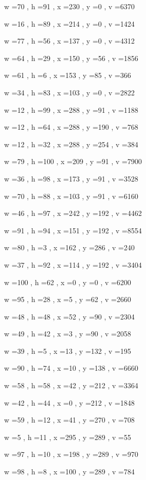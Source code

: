 \documentclass[11pt]{article}
\begin{document}
w =70 , h =91 , x =230 , y =0 , v =6370
\par
w =16 , h =89 , x =214 , y =0 , v =1424
\par
w =77 , h =56 , x =137 , y =0 , v =4312
\par
w =64 , h =29 , x =150 , y =56 , v =1856
\par
w =61 , h =6 , x =153 , y =85 , v =366
\par
w =34 , h =83 , x =103 , y =0 , v =2822
\par
w =12 , h =99 , x =288 , y =91 , v =1188
\par
w =12 , h =64 , x =288 , y =190 , v =768
\par
w =12 , h =32 , x =288 , y =254 , v =384
\par
w =79 , h =100 , x =209 , y =91 , v =7900
\par
w =36 , h =98 , x =173 , y =91 , v =3528
\par
w =70 , h =88 , x =103 , y =91 , v =6160
\par
w =46 , h =97 , x =242 , y =192 , v =4462
\par
w =91 , h =94 , x =151 , y =192 , v =8554
\par
w =80 , h =3 , x =162 , y =286 , v =240
\par
w =37 , h =92 , x =114 , y =192 , v =3404
\par
w =100 , h =62 , x =0 , y =0 , v =6200
\par
w =95 , h =28 , x =5 , y =62 , v =2660
\par
w =48 , h =48 , x =52 , y =90 , v =2304
\par
w =49 , h =42 , x =3 , y =90 , v =2058
\par
w =39 , h =5 , x =13 , y =132 , v =195
\par
w =90 , h =74 , x =10 , y =138 , v =6660
\par
w =58 , h =58 , x =42 , y =212 , v =3364
\par
w =42 , h =44 , x =0 , y =212 , v =1848
\par
w =59 , h =12 , x =41 , y =270 , v =708
\par
w =5 , h =11 , x =295 , y =289 , v =55
\par
w =97 , h =10 , x =198 , y =289 , v =970
\par
w =98 , h =8 , x =100 , y =289 , v =784
\par
\newpage
\end{document}
